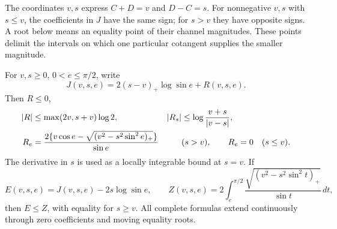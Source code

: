The coordinates $v,s$ express $C+D=v$ and $D-C=s$. For nonnegative
$v,s$ with $s\leq v$, the coefficients in $J$ have the same sign; for $s>v$ they have
opposite signs. A root below means an equality point of their channel
magnitudes. These points delimit the intervals on which one particular
cotangent supplies the smaller magnitude.

\begin{lemma}\label{uc:cancellation-lemma}
For $v,s\geq0$, $0<e\leq\pi/2$, write
\[
 J(v,s,e)=2(s-v)_+\log\sin e+R(v,s,e).
\]
Then $R\leq0$,
\begin{align}\label{uc:R-bounds}
 |R|&\leq\max(2v,s+v)\log2,
 &|R_s|&\leq\log\frac{v+s}{|v-s|},\\
 R_e&=\frac{2\{v\cos e-\sqrt{(v^2-s^2\sin^2e)_+}\}}{\sin e}
 &&(s>v),\qquad R_e=0\quad(s\leq v).\notag
\end{align}
The derivative in $s$ is used as a locally integrable bound at $s=v$.
If
\begin{equation}\label{uc:root-Z}
 E(v,s,e)=J(v,s,e)-2s\log\sin e,\qquad
 Z(v,s,e)=2\int_e^{\pi/2}
       \frac{\sqrt{(v^2-s^2\sin^2t)_+}}{\sin t}\,dt,
\end{equation}
then $E\leq Z$, with equality for $s\geq v$.
All complete formulas extend continuously through zero coefficients
and moving equality roots.
\end{lemma}
